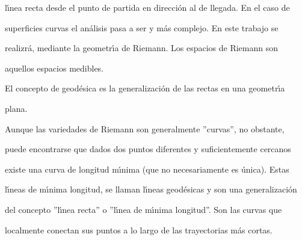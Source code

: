 \documentclass[a4paper,portrait,12pt]{article}
\begin{document}
\begin{flushleft}
l\i{}́nea recta desde el punto de partida en dirección al de llegada. En el caso de
\end{flushleft}


\begin{flushleft}
superficies curvas el análisis pasa a ser y más complejo. En este trabajo se
\end{flushleft}


\begin{flushleft}
realizrá, mediante la geometr\i{}́a de Riemann. Los espacios de Riemann son
\end{flushleft}


\begin{flushleft}
aquellos espacios medibles.
\end{flushleft}


\begin{flushleft}
El concepto de geodésica es la generalización de las rectas en una geometr\i{}́a
\end{flushleft}


\begin{flushleft}
plana.
\end{flushleft}


\begin{flushleft}
Aunque las variedades de Riemann son generalmente ''curvas'', no obstante,
\end{flushleft}


\begin{flushleft}
puede encontrarse que dados dos puntos diferentes y suficientemente cercanos
\end{flushleft}


\begin{flushleft}
existe una curva de longitud m\i{}́nima (que no necesariamente es única). Estas
\end{flushleft}


\begin{flushleft}
l\i{}́neas de m\i{}́nima longitud, se llaman l\i{}́neas geodésicas y son una generalización
\end{flushleft}


\begin{flushleft}
del concepto ''l\i{}́nea recta'' o ''l\i{}́nea de m\i{}́nima longitud''. Son las curvas que
\end{flushleft}


\begin{flushleft}
localmente conectan sus puntos a lo largo de las trayectorias más cortas.
\end{flushleft}
\end{document}
